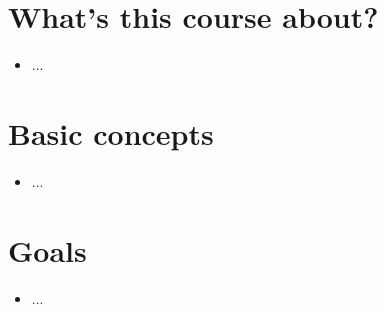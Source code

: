 %
%
\section{What's this course about?}

\begin{itemize}
\item ...
\end{itemize}

\section{Basic concepts}

\begin{itemize}
\item ...
\end{itemize}

\section{Goals}

\begin{itemize}
\item ...
\end{itemize}

